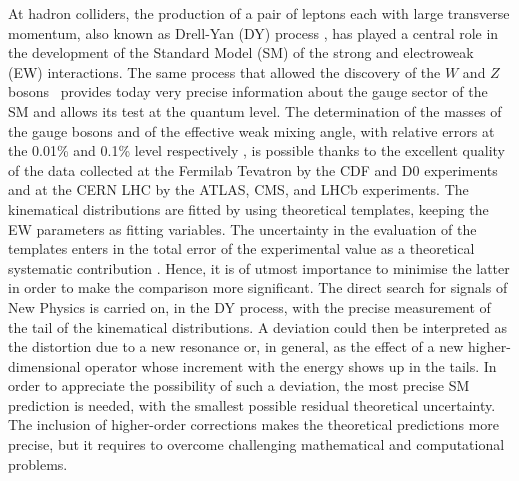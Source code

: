 \documentclass[11pt,a4paper]{article}
\begin{document}
At hadron colliders, the production of a pair of leptons each with large transverse momentum, also known as Drell-Yan (DY) process \cite{Drell:1970wh}, has played a central role in the development of the Standard Model (SM) of the strong and electroweak (EW) interactions.
The same process that allowed the discovery of the $W$ and $Z$ bosons~\cite{Arnison:1983rp,Banner:1983jy,Arnison:1983mk,Bagnaia:1983zx}
provides today very precise information about the gauge sector of the SM and allows its test at the quantum level.
The determination of the masses of the gauge bosons and of the effective weak mixing angle, with relative errors at the 0.01\% and 0.1\% level respectively
\cite{Group:2012gb,Aaboud:2017svj,Aaltonen:2018dxj,ATLAS:2018gqq},
is possible thanks to the excellent quality of the data collected at the Fermilab Tevatron by the CDF and D0 experiments and at the CERN LHC by the ATLAS, CMS, and LHCb experiments.
The kinematical distributions are fitted by using theoretical templates, keeping the EW parameters as fitting variables.
The uncertainty in the evaluation of the templates enters  in the total error of the experimental value as a theoretical systematic contribution \cite{CarloniCalame:2016ouw,Bagnaschi:2019mzi,Behring:2021adr}.
Hence, it is of utmost importance to minimise the latter in order to make the comparison more significant.
The direct search for signals of New Physics is carried on, in the DY process, with the precise measurement of the tail of the kinematical distributions.
A deviation could then be interpreted as the distortion due to a new resonance or, in general, as the effect of a new higher-dimensional operator whose increment
with the energy shows up in the tails. In order to appreciate the possibility of such a deviation, the most precise SM prediction is needed, with the smallest possible residual theoretical uncertainty.
The inclusion of higher-order corrections makes the theoretical predictions more precise, but it requires to overcome challenging mathematical and computational problems.
\end{document}
